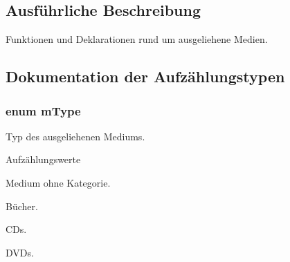 \subsection{Ausführliche Beschreibung}
Funktionen und Deklarationen rund um ausgeliehene Medien. 



\subsection{Dokumentation der Aufzählungstypen}
\subsubsection[{\texorpdfstring{m\+Type}{mType}}]{\setlength{\rightskip}{0pt plus 5cm}enum {\bf m\+Type}}\hypertarget{group___lend_lib_item_ga636cfca014f3212ea82d45e28f9cb51b}{}\label{group___lend_lib_item_ga636cfca014f3212ea82d45e28f9cb51b}


Typ des ausgeliehenen Mediums. 

\begin{Desc}
\item[Aufzählungswerte]\par
\begin{description}
\item[{\em 
other\hypertarget{group___lend_lib_item_gga636cfca014f3212ea82d45e28f9cb51ba7e338ad381a84ef6df07e7d425707025}{}\label{group___lend_lib_item_gga636cfca014f3212ea82d45e28f9cb51ba7e338ad381a84ef6df07e7d425707025}
}]Medium ohne Kategorie. \item[{\em 
book\hypertarget{group___lend_lib_item_gga636cfca014f3212ea82d45e28f9cb51ba6053cbf2a0d801307c80aec065560db6}{}\label{group___lend_lib_item_gga636cfca014f3212ea82d45e28f9cb51ba6053cbf2a0d801307c80aec065560db6}
}]Bücher. \item[{\em 
cd\hypertarget{group___lend_lib_item_gga636cfca014f3212ea82d45e28f9cb51bae7dab93ee81e7f74327bed188e6f3748}{}\label{group___lend_lib_item_gga636cfca014f3212ea82d45e28f9cb51bae7dab93ee81e7f74327bed188e6f3748}
}]C\+Ds. \item[{\em 
dvd\hypertarget{group___lend_lib_item_gga636cfca014f3212ea82d45e28f9cb51ba9250e48899d18438f51e7df957e35ea5}{}\label{group___lend_lib_item_gga636cfca014f3212ea82d45e28f9cb51ba9250e48899d18438f51e7df957e35ea5}
}]D\+V\+Ds. \end{description}
\end{Desc}
